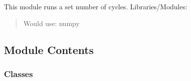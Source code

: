 \documentclass[letterpaper,10pt,english]{sphinxmanual}
\begin{document}
\begin{fulllineitems}
\label{\detokenize{autoapi/Field/index:Field.mismatch_truediv}}
\end{fulllineitems}


\begin{fulllineitems}
\label{\detokenize{autoapi/Field/index:Field.Infinity}}
\end{fulllineitems}



\section{}
\label{\detokenize{autoapi/flo103_ConvergenceChecker/index:module-flo103_ConvergenceChecker}}\label{\detokenize{autoapi/flo103_ConvergenceChecker/index:flo103-convergencechecker}}\label{\detokenize{autoapi/flo103_ConvergenceChecker/index::doc}}
\sphinxAtStartPar
This module runs a set number of cycles.
Libraries/Modules:
\begin{quote}

\sphinxAtStartPar
Would use: numpy
\end{quote}


\subsection{Module Contents}
\label{\detokenize{autoapi/flo103_ConvergenceChecker/index:module-contents}}

\subsubsection{Classes}
\label{\detokenize{autoapi/flo103_ConvergenceChecker/index:classes}}
\end{document}
